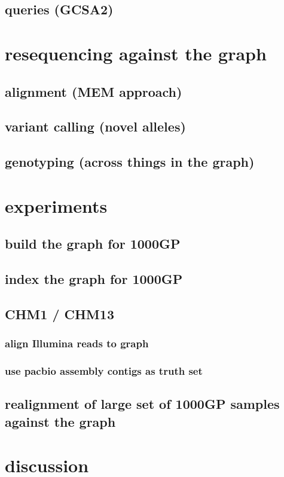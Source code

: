 \documentclass{article}
\begin{document}
\subsection{queries (GCSA2)}


\section{resequencing against the graph}

\subsection{alignment (MEM approach)}

\subsection{variant calling (novel alleles)}

\subsection{genotyping (across things in the graph)}


\section{experiments}

\subsection{build the graph for 1000GP}

\subsection{index the graph for 1000GP}

\subsection{CHM1 / CHM13}
\subsubsection{align Illumina reads to graph}
\subsubsection{use pacbio assembly contigs as truth set}

\subsection{realignment of large set of 1000GP samples against the graph}


\section{discussion}

{}


\end{document}

